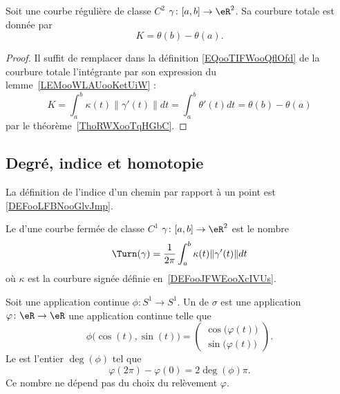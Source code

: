 \begin{lemma}
	Soit une courbe régulière de classe \( C^2\) \( \gamma\colon \mathopen[ a , b \mathclose]\to \eR^2\). Sa courbure totale est donnée par
	\begin{equation}
		K=\theta(b)-\theta(a).
	\end{equation}
\end{lemma}

\begin{proof}
	Il suffit de remplacer dans la définition \eqref{EQooTIFWooQflOfd} de la courbure totale l'intégrante par son expression du lemme~\ref{LEMooWLAUooKetUiW} :
	\begin{equation}
		K=\int_a^b\kappa(t)\| \gamma'(t) \|dt=\int_a^b\theta'(t)dt=\theta(b)-\theta(a)
	\end{equation}
	par le théorème~\ref{ThoRWXooTqHGbC}.
\end{proof}

\subsection{Degré, indice et homotopie}

La définition de l'indice d'un chemin par rapport à un point est \ref{DEFooLFBNooGlvJmp}.

\begin{definition}
	Le  d'une courbe fermée de classe \( C^1\) \( \gamma\colon \mathopen[ a , b \mathclose]\to \eR^2\) est le nombre
	\begin{equation}
		\Turn(\gamma)=\frac{1}{ 2\pi }\int_a^b\kappa(t)\| \gamma'(t) \|dt
	\end{equation}
	où \( \kappa\) est la courbure signée définie en~\ref{DEFooJFWEooXcIVUs}.
\end{definition}

\begin{lemmaDef}        \label{DEFooTKBUooNVcheO}
	Soit une application continue \( \phi\colon S^1\to S^1\). Un  de \( \sigma\) est une application \( \varphi\colon \eR\to \eR\) une application continue telle que
	\begin{equation}
		\phi\big( \cos(t),\sin(t) \big)=\begin{pmatrix}
			\cos\big( \varphi(t) \big) \\
			\sin\big( \varphi(t) \big)
		\end{pmatrix}.
	\end{equation}
	Le  est l'entier \( \deg(\phi)\) tel que
	\begin{equation}
		\varphi(2\pi)-\varphi(0)=2\deg(\phi)\pi.
	\end{equation}
	Ce nombre ne dépend pas du choix du relèvement \( \varphi\).
\end{lemmaDef}

